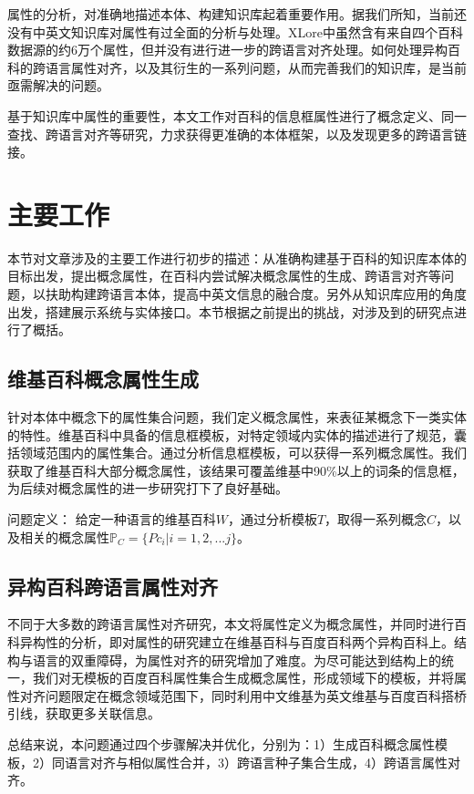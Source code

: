 属性的分析，对准确地描述本体、构建知识库起着重要作用。据我们所知，当前还没有中英文知识库对属性有过全面的分析与处理。XLore中虽然含有来自四个百科数据源的约6万个属性，但并没有进行进一步的跨语言对齐处理。如何处理异构百科的跨语言属性对齐，以及其衍生的一系列问题，从而完善我们的知识库，是当前亟需解决的问题。

基于知识库中属性的重要性，本文工作对百科的信息框属性进行了概念定义、同一查找、跨语言对齐等研究，力求获得更准确的本体框架，以及发现更多的跨语言链接。

\section{主要工作}
本节对文章涉及的主要工作进行初步的描述：从准确构建基于百科的知识库本体的目标出发，提出概念属性，在百科内尝试解决概念属性的生成、跨语言对齐等问题，以扶助构建跨语言本体，提高中英文信息的融合度。另外从知识库应用的角度出发，搭建展示系统与实体接口。本节根据之前提出的挑战，对涉及到的研究点进行了概括。

\subsection{维基百科概念属性生成}
针对本体中概念下的属性集合问题，我们定义概念属性，来表征某概念下一类实体的特性。维基百科中具备的信息框模板，对特定领域内实体的描述进行了规范，囊括领域范围内的属性集合。通过分析信息框模板，可以获得一系列概念属性。我们获取了维基百科大部分概念属性，该结果可覆盖维基中90\%以上的词条的信息框，为后续对概念属性的进一步研究打下了良好基础。

{\heiti 问题定义：} 给定一种语言的维基百科$W$，通过分析模板$T$，取得一系列概念$C$，以及相关的概念属性$\mathbb{P}_C=\{P{c_i}|i=1,2,...j\}$。

\subsection{异构百科跨语言属性对齐}
不同于大多数的跨语言属性对齐研究，本文将属性定义为概念属性，并同时进行百科异构性的分析，即对属性的研究建立在维基百科与百度百科两个异构百科上。结构与语言的双重障碍，为属性对齐的研究增加了难度。为尽可能达到结构上的统一，我们对无模板的百度百科属性集合生成概念属性，形成领域下的模板，并将属性对齐问题限定在概念领域范围下，同时利用中文维基为英文维基与百度百科搭桥引线，获取更多关联信息。

总结来说，本问题通过四个步骤解决并优化，分别为：1）生成百科概念属性模板，2）同语言对齐与相似属性合并，3）跨语言种子集合生成，4）跨语言属性对齐。

